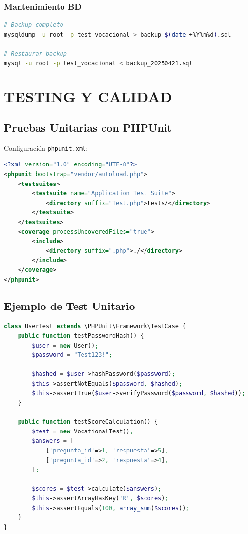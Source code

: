\documentclass[12pt, a4paper]{report}
\begin{document}
\subsection{Mantenimiento BD}
\begin{lstlisting}[language=Bash]
# Backup completo
mysqldump -u root -p test_vocacional > backup_$(date +%Y%m%d).sql

# Restaurar backup
mysql -u root -p test_vocacional < backup_20250421.sql
\end{lstlisting}

\chapter{TESTING Y CALIDAD}

\section{Pruebas Unitarias con PHPUnit}
Configuración \texttt{phpunit.xml}:
\begin{lstlisting}[language=XML]
<?xml version="1.0" encoding="UTF-8"?>
<phpunit bootstrap="vendor/autoload.php">
    <testsuites>
        <testsuite name="Application Test Suite">
            <directory suffix="Test.php">tests/</directory>
        </testsuite>
    </testsuites>
    <coverage processUncoveredFiles="true">
        <include>
            <directory suffix=".php">./</directory>
        </include>
    </coverage>
</phpunit>
\end{lstlisting}

\section{Ejemplo de Test Unitario}
\begin{lstlisting}[language=PHP]
class UserTest extends \PHPUnit\Framework\TestCase {
    public function testPasswordHash() {
        $user = new User();
        $password = "Test123!";
        
        $hashed = $user->hashPassword($password);
        $this->assertNotEquals($password, $hashed);
        $this->assertTrue($user->verifyPassword($password, $hashed));
    }
    
    public function testScoreCalculation() {
        $test = new VocationalTest();
        $answers = [
            ['pregunta_id'=>1, 'respuesta'=>5],
            ['pregunta_id'=>2, 'respuesta'=>4],
        ];
        
        $scores = $test->calculate($answers);
        $this->assertArrayHasKey('R', $scores);
        $this->assertEquals(100, array_sum($scores));
    }
}
\end{lstlisting}
\end{document}
